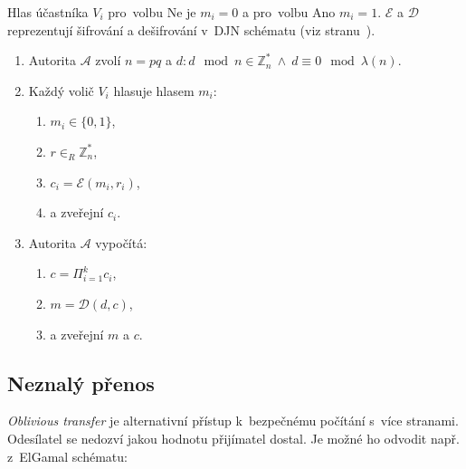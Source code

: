 \begin{mdframed}
Hlas účastníka $V_i$ pro~volbu Ne je $m_i = 0$ a pro~volbu Ano $m_i = 1$.
$\mathcal{E}$ a $\mathcal{D}$ reprezentují šifrování a dešifrování v~DJN schématu (viz stranu~\pageref{fig:paillier-djn}).

\begin{enumerate}
\item Autorita $\mathcal{A}$ zvolí $n = pq$ a $d: d \mod n \in \mathbb{Z}_n^* \ \wedge \ d \equiv 0 \mod \lambda(n)$.
\item Každý volič $V_i$ hlasuje hlasem $m_i$:
    \begin{enumerate}
    \item $m_i \in \{0, 1\}$,
    \item $r \in_R \mathbb{Z}_n^*$,
    \item $c_i = \mathcal{E}(m_i, r_i)$,
    \item a zveřejní $c_i$.
    \end{enumerate}
\item Autorita $\mathcal{A}$ vypočítá:
    \begin{enumerate}
    \item $c = \Pi_{i=1}^k c_i$,
    \item $m = \mathcal{D}(d, c)$,
    \item a zveřejní $m$ a $c$.
    \end{enumerate}
\end{enumerate}
\end{mdframed}


\subsection{Neznalý přenos}

\emph{Oblivious transfer} je alternativní přístup k~bezpečnému počítání s~více stranami.
Odesílatel se nedozví jakou hodnotu přijímatel dostal.
Je možné ho odvodit např. z~ElGamal schématu:

